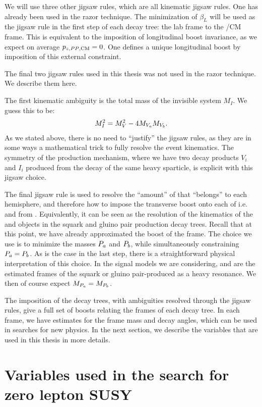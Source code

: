 We will use three other jigsaw rules, which are all kinematic jigsaw rules.
One has already been used in the razor technique.
The minimization of $\beta_L$ will be used as the jigsaw rule in the first step of each decay tree: the lab frame to the \PP/CM frame.
This is equivalent to the imposition of longitudinal boost invariance, as we expect on average $p_{z,\text{\ensuremath{PP },CM}} = 0$.
One defines a unique longitudinal boost by imposition of this external constraint.

The final two jigsaw rules used in this thesis was not used in the razor technique.
We describe them here.

The first kinematic ambiguity is the total mass of the invisible system $M_I$.
We guess this to be:
\begin{align}
M_I^2 = M_V^2 - 4 M_{V_a} M_{V_b}.
\end{align}
As we stated above, there is no need to ``justify'' the jigsaw rules, as they are in some ways a mathematical trick to fully resolve the event kinematics.
The symmetry of the production mechanism, where we have two decay products $V_i$ and $I_i$ produced from the decay of the same heavy sparticle, is explicit with this jigsaw choice.

The final jigsaw rule is used to resolve the ``amount'' of \met that ``belongs'' to each hemisphere, and therefore how to impose the transverse boost onto each of i.e. \Pa and \Pb from \PP.
Equivalently, it can be seen as the resolution of the kinematics of the \Ia and \Ib objects in the squark and gluino pair production decay trees.
Recall that at this point, we have already approximated the boost of the \PP frame.
The choice we use is to minimize the masses $P_a$ and $P_b$, while simultaneously constraining $P_a = P_b$.
As is the case in the last step, there is a straightforward physical interpretation of this choice.
In the signal models we are considering, \Pa and \Pb are the estimated frames of the squark or gluino pair-produced as a heavy resonance.
We then of course expect $M_{P_a} = M_{P_b}$.

The imposition of the decay trees, with ambiguities resolved through the jigsaw rules, give a full set of boosts relating the frames of each decay tree.
In each frame, we have estimates for the frame mass and decay angles, which can be used in searches for new physics.
In the next section, we describe the variables that are used in this thesis in more details.

\section{Variables used in the search for zero lepton SUSY}
\label{sec:rjr_hadronic}

